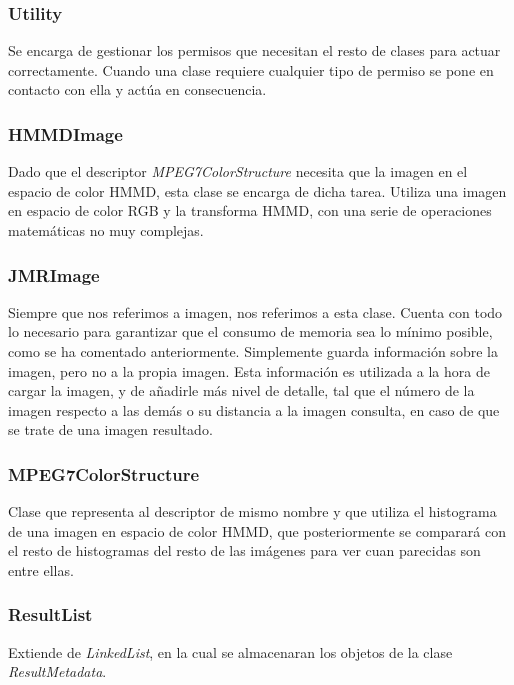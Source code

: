 \subsubsection{Utility}

Se encarga de gestionar los permisos que necesitan el resto de clases para actuar correctamente. Cuando una clase requiere cualquier tipo de permiso se pone en contacto con ella y actúa en consecuencia.

\subsubsection{HMMDImage}

Dado que el descriptor \textit{MPEG7ColorStructure} necesita que la imagen en el espacio de color HMMD, esta clase se encarga de dicha tarea. Utiliza una imagen en espacio de color RGB y la transforma HMMD, con una serie de operaciones matemáticas no muy complejas.

\subsubsection{JMRImage}

Siempre que nos referimos a imagen, nos referimos a esta clase. Cuenta con todo lo necesario para garantizar que el consumo de memoria sea lo mínimo posible, como se ha comentado anteriormente. Simplemente guarda información sobre la imagen, pero no a la propia imagen. Esta información es utilizada a la hora de cargar la imagen, y de añadirle más nivel de detalle, tal que el número de la imagen respecto a las demás o su distancia a la imagen consulta, en caso de que se trate de una imagen resultado.

\subsubsection{MPEG7ColorStructure}

Clase que representa al descriptor de mismo nombre y que utiliza el histograma de una imagen en espacio de color HMMD, que posteriormente se comparará con el resto de histogramas del resto de las imágenes para ver cuan parecidas son entre ellas.

\subsubsection{ResultList}

Extiende de \textit{LinkedList}, en la cual se almacenaran los objetos de la clase \textit{ResultMetadata}.

